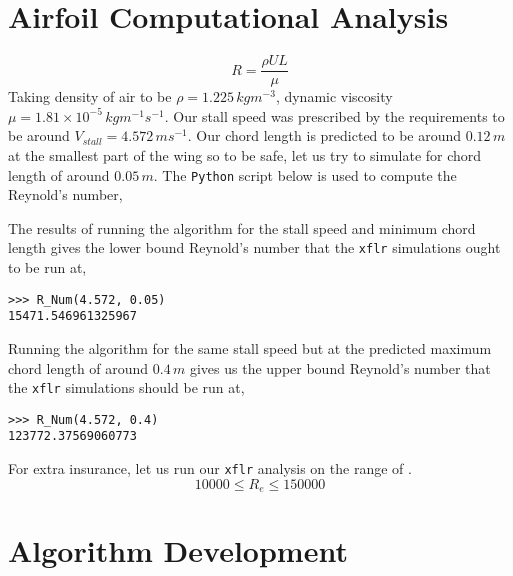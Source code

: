 \section{Airfoil Computational Analysis}
\begin{comment}
\end{comment}
$$R = \frac{\rho U L}{\mu}$$
Taking density of air to be $\rho=1.225\,kgm^{-3}$, dynamic viscosity $\mu=1.81\times10^{-5}\,kgm^{-1}s^{-1}$. 
Our stall speed was prescribed by the requirements to be around $V_{stall} = 4.572\,ms^{-1}$. 
Our chord length is predicted to be around $0.12\,m$ at the smallest part of the wing so to be safe, let us try to simulate for chord length of around $0.05\,m$. The \texttt{Python} script below is used to compute the Reynold's number,

$$$$
The results of running the algorithm for the stall speed and minimum chord length gives the lower bound Reynold's number that the \texttt{xflr} simulations ought to be run at,
\begin{lstlisting}
>>> R_Num(4.572, 0.05)
15471.546961325967
\end{lstlisting}
$$$$
Running the algorithm for the same stall speed but at the predicted maximum chord length of around $0.4\,m$ gives us the upper bound Reynold's number that the \texttt{xflr} simulations should be run at,
\begin{lstlisting}
>>> R_Num(4.572, 0.4)
123772.37569060773
\end{lstlisting}
$$$$
For extra insurance, let us run our \texttt{xflr} analysis on the range of .
\begin{equation}10000 \leq R_{e} \leq 150000 \label{Re req}\end{equation}


\section{Algorithm Development}
\begin{comment}
\end{comment}

